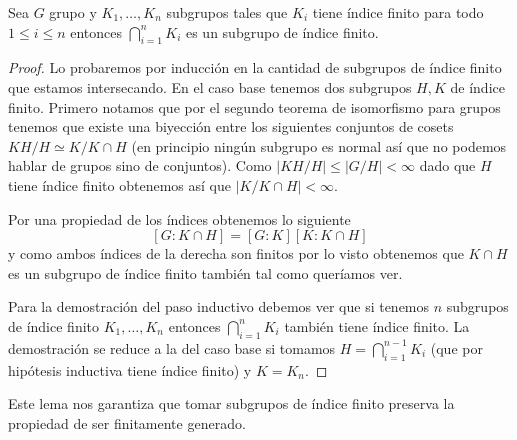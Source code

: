 \documentclass[tesis.tex]{subfiles}
\begin{document}
\begin{lema}\label{lema_indice_interseccion}
	Sea $G$ grupo y $K_1, \dots, K_n$ subgrupos tales que $K_{i}$ tiene índice finito para todo $ 1 \le i \le n $ entonces $\bigcap_{i=1}^{n} K_{i}$ es un subgrupo de índice finito.
\end{lema}
\begin{proof}
	Lo probaremos por inducción en la cantidad de subgrupos de índice finito que estamos intersecando.
	En el caso base tenemos dos subgrupos $H,K$ de índice finito.
	Primero notamos que por el segundo teorema de isomorfismo para grupos tenemos que existe una biyección entre los siguientes conjuntos de cosets $ KH / H \simeq K / K \cap H $ (en principio ningún subgrupo es normal así que no podemos hablar de grupos sino de conjuntos).
	Como  $|KH / H| \le |G / H| < \infty$ dado que $H$ tiene índice finito obtenemos así que $|K / K \cap H| < \infty$.
	
	Por una propiedad de los índices obtenemos lo siguiente
	\[
	[G:K\cap H] = [G:K][K: K \cap H]
	\]
	y como ambos índices de la derecha son finitos por lo visto obtenemos que $K \cap H$ es un subgrupo de índice finito también tal como queríamos ver.
	
	Para la demostración del paso inductivo debemos ver que si tenemos $n$ subgrupos de índice finito $K_{1}, \dots, K_{n}$ entonces $\bigcap_{i=1}^{n} K_{i}$ también tiene índice finito.
	La demostración se reduce a la del caso base si tomamos $H = \bigcap_{i=1}^{n-1} K_{i}$ (que por hipótesis inductiva tiene índice finito) y $K = K_{n}$.
\end{proof}

Este lema nos garantiza que tomar subgrupos de índice finito preserva la propiedad de ser finitamente generado.
\end{document}
